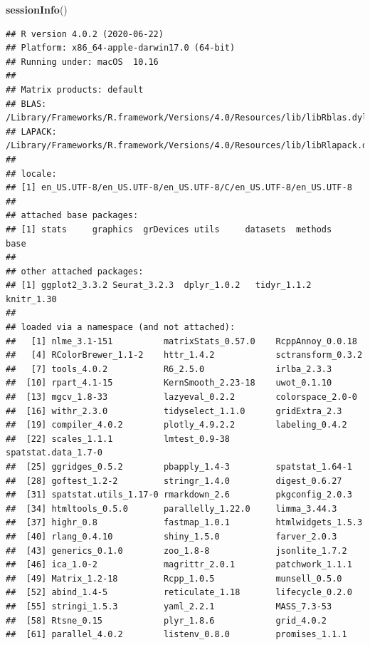 \documentclass[]{article}
\newenvironment{Shaded}{\begin{snugshade}}{\end{snugshade}}
\newcommand{\KeywordTok}[1]{\textcolor[rgb]{0.13,0.29,0.53}{\textbf{#1}}}
\newcommand{\NormalTok}[1]{#1}
\begin{document}
\begin{Shaded}
\begin{Highlighting}[]
\KeywordTok{sessionInfo}\NormalTok{()}
\end{Highlighting}
\end{Shaded}

\begin{verbatim}
## R version 4.0.2 (2020-06-22)
## Platform: x86_64-apple-darwin17.0 (64-bit)
## Running under: macOS  10.16
## 
## Matrix products: default
## BLAS:   /Library/Frameworks/R.framework/Versions/4.0/Resources/lib/libRblas.dylib
## LAPACK: /Library/Frameworks/R.framework/Versions/4.0/Resources/lib/libRlapack.dylib
## 
## locale:
## [1] en_US.UTF-8/en_US.UTF-8/en_US.UTF-8/C/en_US.UTF-8/en_US.UTF-8
## 
## attached base packages:
## [1] stats     graphics  grDevices utils     datasets  methods   base     
## 
## other attached packages:
## [1] ggplot2_3.3.2 Seurat_3.2.3  dplyr_1.0.2   tidyr_1.1.2   knitr_1.30   
## 
## loaded via a namespace (and not attached):
##   [1] nlme_3.1-151          matrixStats_0.57.0    RcppAnnoy_0.0.18     
##   [4] RColorBrewer_1.1-2    httr_1.4.2            sctransform_0.3.2    
##   [7] tools_4.0.2           R6_2.5.0              irlba_2.3.3          
##  [10] rpart_4.1-15          KernSmooth_2.23-18    uwot_0.1.10          
##  [13] mgcv_1.8-33           lazyeval_0.2.2        colorspace_2.0-0     
##  [16] withr_2.3.0           tidyselect_1.1.0      gridExtra_2.3        
##  [19] compiler_4.0.2        plotly_4.9.2.2        labeling_0.4.2       
##  [22] scales_1.1.1          lmtest_0.9-38         spatstat.data_1.7-0  
##  [25] ggridges_0.5.2        pbapply_1.4-3         spatstat_1.64-1      
##  [28] goftest_1.2-2         stringr_1.4.0         digest_0.6.27        
##  [31] spatstat.utils_1.17-0 rmarkdown_2.6         pkgconfig_2.0.3      
##  [34] htmltools_0.5.0       parallelly_1.22.0     limma_3.44.3         
##  [37] highr_0.8             fastmap_1.0.1         htmlwidgets_1.5.3    
##  [40] rlang_0.4.10          shiny_1.5.0           farver_2.0.3         
##  [43] generics_0.1.0        zoo_1.8-8             jsonlite_1.7.2       
##  [46] ica_1.0-2             magrittr_2.0.1        patchwork_1.1.1      
##  [49] Matrix_1.2-18         Rcpp_1.0.5            munsell_0.5.0        
##  [52] abind_1.4-5           reticulate_1.18       lifecycle_0.2.0      
##  [55] stringi_1.5.3         yaml_2.2.1            MASS_7.3-53          
##  [58] Rtsne_0.15            plyr_1.8.6            grid_4.0.2           
##  [61] parallel_4.0.2        listenv_0.8.0         promises_1.1.1       

\end{verbatim}
\end{document}
